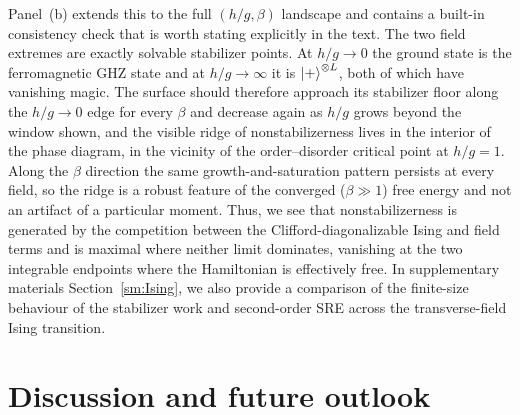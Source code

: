 \documentclass[aps,pra,superscriptaddress,twocolumn,longbibliography]{revtex4-2}
\begin{document}
Panel~(b) extends this to the full $(h/g,\beta)$ landscape and contains a
built-in consistency check that is worth stating explicitly in the text. The two
field extremes are exactly solvable stabilizer points.
At $h/g\to0$ the ground
state is the ferromagnetic GHZ state and at $h/g\to\infty$ it is
$\ket{+}^{\otimes L}$, both of which have vanishing magic. The surface should
therefore approach its stabilizer floor along the $h/g\to0$ edge for every
$\beta$ and decrease again as $h/g$ grows beyond the window shown, and the
visible ridge of nonstabilizerness lives in the interior of the phase diagram,
in the vicinity of the order--disorder critical point at $h/g=1$. Along the
$\beta$ direction the same growth-and-saturation pattern persists at every field,
so the ridge is a robust feature of the converged ($\beta\gg1$) free energy and
not an artifact of a particular moment. 
Thus, we see that nonstabilizerness is generated by the competition between the Clifford-diagonalizable Ising and field terms and is maximal where neither limit dominates, vanishing at the two integrable endpoints where the Hamiltonian is effectively free.
In supplementary materials Section~\ref{sm:Ising}, we also provide a comparison of the finite-size behaviour of the stabilizer work and second-order SRE across the transverse-field Ising transition. 




\section{Discussion and future outlook}\label{sec:discussion}
\end{document}
